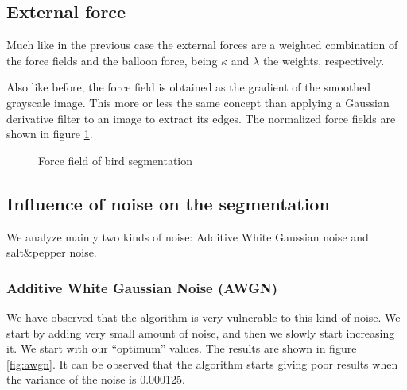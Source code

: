 \subsection{External force}

Much like in the previous case the external forces are a weighted combination of the force fields and the balloon force, being $\kappa$ and $\lambda$ the weights, respectively.

Also like before, the force field is obtained as the gradient of the smoothed grayscale image. This more or less the same concept than applying a Gaussian derivative filter to an image to extract its edges. The normalized force fields are shown in figure \ref{fig:bird-ff}.

\begin{figure}[!hbt]
\centering   
{}
\caption{Force field of bird segmentation}
\label{fig:bird-ff}
\end{figure}

\subsection{Influence of noise on the segmentation}

We analyze mainly two kinds of noise: Additive White Gaussian noise and salt\&pepper noise.

\subsubsection{Additive White Gaussian Noise (AWGN) }

We have observed that the algorithm is very vulnerable to this kind of noise. We start by adding very
small amount of noise, and then we slowly start increasing it. We start with our ``optimum'' values. The results are shown in figure \ref{fig:awgn}. It can be observed that the algorithm starts giving poor results when the variance of the noise is 0.000125.

